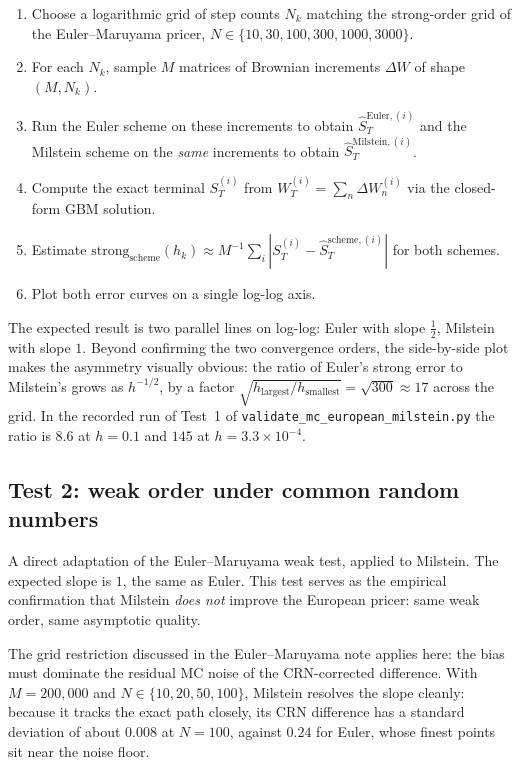 \documentclass[11pt,a4paper]{article}
\theoremstyle{plain}
\theoremstyle{definition}
\theoremstyle{remark}
\begin{document}
\begin{enumerate}
\item Choose a logarithmic grid of step counts $N_k$ matching the
strong-order grid of the Euler--Maruyama pricer, $N \in \{10, 30, 100,
300, 1000, 3000\}$.
\item For each $N_k$, sample $M$ matrices of Brownian increments
$\Delta W$ of shape $(M, N_k)$.
\item Run the Euler scheme on these increments to obtain $\hat S_T^{
\mathrm{Euler}, (i)}$ and the Milstein scheme on the \emph{same}
increments to obtain $\hat S_T^{\mathrm{Milstein}, (i)}$.
\item Compute the exact terminal $S_T^{(i)}$ from $W_T^{(i)} = \sum_n
\Delta W_n^{(i)}$ via the closed-form GBM solution.
\item Estimate
$\mathrm{strong}_{\mathrm{scheme}}(h_k) \approx M^{-1} \sum_i
|S_T^{(i)} - \hat S_T^{\mathrm{scheme}, (i)}|$
for both schemes.
\item Plot both error curves on a single log-log axis.
\end{enumerate}

The expected result is two parallel lines on log-log: Euler with
slope $\tfrac{1}{2}$, Milstein with slope $1$. Beyond confirming the
two convergence orders, the side-by-side plot makes the asymmetry
visually obvious: the ratio of Euler's strong error to Milstein's
grows as $h^{-1/2}$, by a factor
$\sqrt{h_{\mathrm{largest}} / h_{\mathrm{smallest}}} = \sqrt{300}
\approx 17$ across the grid. In the recorded run of Test~1 of
\texttt{validate\_mc\_european\_milstein.py} the ratio is $8.6$ at
$h = 0.1$ and $145$ at $h = 3.3 \times 10^{-4}$.

\subsection{Test 2: weak order under common random numbers}

A direct adaptation of the Euler--Maruyama weak test, applied to
Milstein. The expected slope is $1$, the same as Euler. This test
serves as the empirical confirmation that Milstein \emph{does not}
improve the European pricer: same weak order, same asymptotic
quality.

The grid restriction discussed in the Euler--Maruyama note
applies here: the bias must dominate the residual MC noise of the
CRN-corrected difference. With $M = 200{,}000$ and $N \in \{10, 20,
50, 100\}$, Milstein resolves the slope cleanly: because it tracks the
exact path closely, its CRN difference has a standard deviation of
about $0.008$ at $N = 100$, against $0.24$ for Euler, whose finest
points sit near the noise floor.
\end{document}
